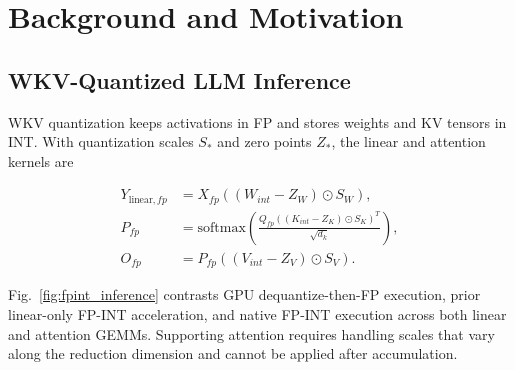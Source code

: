 \documentclass[sigconf,anonymous,nonacm]{acmart}
\newcommand{\fpint}{FP-INT}
\newcommand{\wkv}{WKV}
\newcommand{\Cfou}{FINISH}
\begin{document}

\section{Background and Motivation}
\subsection{WKV-Quantized LLM Inference}

\wkv{} quantization keeps activations in FP and stores weights and KV tensors in INT. With quantization scales $S_*$ and zero points $Z_*$, the linear and attention kernels are

\begin{align}
    Y_{\mathrm{linear},fp}
    &=
    X_{fp}
    \left(
        \left(
            W_{int}
            -
            Z_W
        \right)
        \odot
        S_W
    \right),
    \\
    P_{fp}
    &=
    \mathrm{softmax}
    \left(
        \frac{
            Q_{fp}
            \left(
                \left(
                    K_{int}
                    -
                    Z_K
                \right)
                \odot
                S_K
            \right)^T
        }{
            \sqrt{d_k}
        }
    \right),
    \\
    O_{fp}
    &=
    P_{fp}
    \left(
        \left(
            V_{int}
            -
            Z_V
        \right)
        \odot
        S_V
    \right).
\end{align}

Fig.~\ref{fig:fpint_inference} contrasts GPU dequantize-then-FP execution, prior linear-only \fpint{} acceleration, and native \fpint{} execution across both linear and attention GEMMs. Supporting attention requires handling scales that vary along the reduction dimension and cannot be applied after accumulation.
\end{document}
